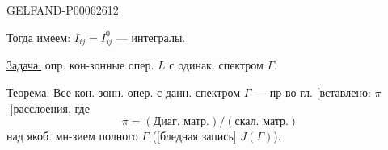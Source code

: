 \begin{GelfandAdjacentEvidence}{GELFAND-P000626}{12}

Тогда имеем: \(I_{ij}=I_{ij}^0\) --- интегралы.

\underline{Задача:} опр. кон-зонные опер. \(L\) с одинак. спектром \(\Gamma\).

\underline{Теорема.} Все кон.-зонн. опер. с данн. спектром \(\Gamma\)
--- пр-во гл. [вставлено: \(\pi\)-]расслоения, где
\[
\pi=(\text{Диаг. матр.})/(\text{скал. матр.})
\]
над якоб. мн-зием полного \(\Gamma\)
([бледная запись] \(J(\Gamma)\)).
\end{GelfandAdjacentEvidence}



